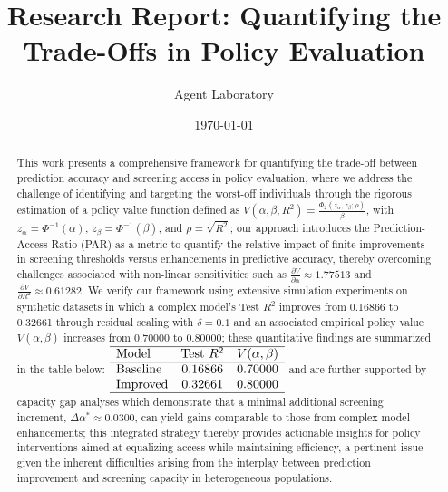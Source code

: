 \documentclass{article}
\title{Research Report: Quantifying the Trade-Offs in Policy Evaluation}
\author{Agent Laboratory}
\date{\today}
\begin{document}
\maketitle

\begin{abstract}
This work presents a comprehensive framework for quantifying the trade-off between prediction accuracy and screening access in policy evaluation, where we address the challenge of identifying and targeting the worst-off individuals through the rigorous estimation of a policy value function defined as \( V(\alpha,\beta,R^2)=\frac{\Phi_2(z_\alpha,z_\beta;\rho)}{\beta} \), with \( z_\alpha=\Phi^{-1}(\alpha) \), \( z_\beta=\Phi^{-1}(\beta) \), and \( \rho=\sqrt{R^2} \); our approach introduces the Prediction-Access Ratio (PAR) as a metric to quantify the relative impact of finite improvements in screening thresholds versus enhancements in predictive accuracy, thereby overcoming challenges associated with non-linear sensitivities such as \(\frac{\partial V}{\partial \alpha}\approx1.77513\) and \(\frac{\partial V}{\partial R^2}\approx0.61282\). We verify our framework using extensive simulation experiments on synthetic datasets in which a complex model’s Test \(R^2\) improves from 0.16866 to 0.32661 through residual scaling with \(\delta=0.1\) and an associated empirical policy value \( V(\alpha,\beta) \) increases from 0.70000 to 0.80000; these quantitative findings are summarized in the table below: \(\begin{array}{lcc} \hline \text{Model} & \text{Test } R^2 & V(\alpha,\beta) \\ \hline \text{Baseline} & 0.16866 & 0.70000 \\ \text{Improved} & 0.32661 & 0.80000 \\ \hline \end{array}\) and are further supported by capacity gap analyses which demonstrate that a minimal additional screening increment, \(\Delta\alpha^* \approx 0.0300\), can yield gains comparable to those from complex model enhancements; this integrated strategy thereby provides actionable insights for policy interventions aimed at equalizing access while maintaining efficiency, a pertinent issue given the inherent difficulties arising from the interplay between prediction improvement and screening capacity in heterogeneous populations.
\end{abstract}
\end{document}
